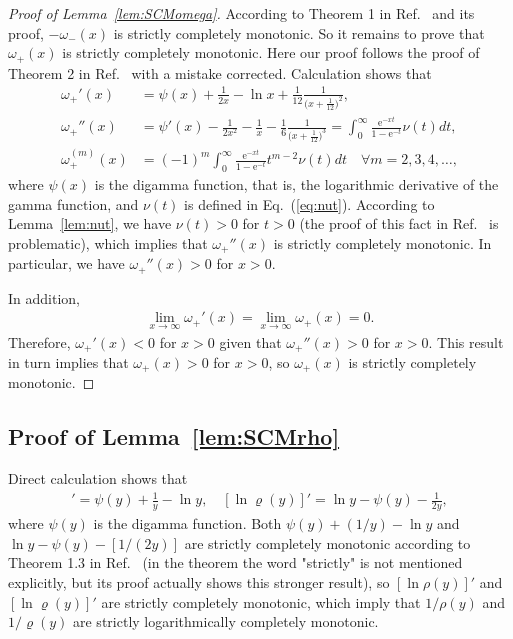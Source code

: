 \documentclass[aop]{imsart}
\theoremstyle{plain}
\theoremstyle{remark}
\newcommand{\rme}{\mathrm{e}}
\newcommand{\1}{\operatorname{\uppercase\expandafter{\romannumeral1}}}
\newcommand{\2}{\operatorname{\uppercase\expandafter{\romannumeral2}}}
\newcommand{\3}{\operatorname{\uppercase\expandafter{\romannumeral3}}}
\newcommand{\4}{\operatorname{\uppercase\expandafter{\romannumeral4}}}
\newcommand{\5}{\operatorname{\uppercase\expandafter{\romannumeral5}}}
\newcommand{\6}{\operatorname{\uppercase\expandafter{\romannumeral6}}}
\newcommand{\7}{\operatorname{\uppercase\expandafter{\romannumeral7}}}
\newcommand{\8}{\operatorname{\uppercase\expandafter{\romannumeral8}}}
\newcommand{\9}{\operatorname{\uppercase\expandafter{\romannumeral9}}}
\newcommand{\eref}[1]{Eq.~\textup{(\ref{#1})}}
\newcommand{\lref}[1]{Lemma~\ref{#1}}
\newcommand{\rcite}[1]{Ref.~\cite{#1}}
\begin{document}
\begin{appendix}
\begin{proof}[Proof of \lref{lem:SCMomega}]
	According to Theorem 1  in \rcite{Mort10} and its proof,   $-\omega_-(x)$ is strictly completely monotonic. So it remains to prove that $\omega_+(x)$ is strictly completely monotonic. Here our proof follows the proof of Theorem 2 in  \rcite{Mort10} with a mistake corrected. Calculation shows that
	\begin{align}
	\omega_+'(x)&=\psi(x)+\frac{1}{2x}-\ln x+\frac{1}{12}\frac{1}{\bigl(x+\frac{1}{12}\bigr)^2},\\
	\omega_+''(x)&=\psi'(x)-\frac{1}{2x^2}-\frac{1}{x}-\frac{1}{6}\frac{1}{\bigl(x+\frac{1}{12}\bigr)^3}=
	\int_{0}^\infty\frac{\rme^{-xt}}{1-\rme^{-t}}\nu(t)dt,\\
	\omega_+^{(m)}(x)&=(-1)^m\int_{0}^\infty\frac{\rme^{-xt}}{1-\rme^{-t}}t^{m-2}\nu(t)dt \quad \forall m=2, 3, 4,\ldots,
	\end{align}
	where $\psi(x)$ is the digamma function, that is, the logarithmic derivative of the gamma function, and $\nu(t)$ is defined in \eref{eq:nut}. 
	According to \lref{lem:nut}, we have $\nu(t)>0$ for $t>0$ (the proof of this fact in  \rcite{Mort10} is problematic), which implies that $\omega_+''(x)$ is strictly completely monotonic. In particular, we have $\omega_+''(x)>0$ for $x>0$. 
	
	In addition,
	\begin{align}
	\lim_{x\to\infty} \omega_+'(x)=\lim_{x\to\infty} \omega_+(x)=0. 
	\end{align}
	Therefore, $\omega_+'(x)<0$ for $x>0$ given that $\omega_+''(x)>0$ for $x>0$. This result in turn implies that $\omega_+(x)>0$ for $x>0$, so  $\omega_+(x)$ is strictly completely monotonic. 
\end{proof}


\subsection{Proof of \lref{lem:SCMrho}}
	Direct calculation shows that
	\begin{align}
	[\ln \rho(y)]'=\psi(y)+\frac{1}{y}-\ln y,\quad
	[\ln \varrho(y)]'=\ln y-\psi(y)-\frac{1}{2y},
	\end{align}
	where $\psi(y)$ is the digamma function. 
	Both $\psi(y)+(1/y)-\ln y$ and $\ln y-\psi(y)-[1/(2y)]$ are strictly completely monotonic  according to Theorem 1.3 in \rcite{Qi07} (in the theorem the word "strictly" is not mentioned explicitly, but its proof  actually shows this stronger result), so  $[\ln \rho(y)]'$ and $[\ln \varrho(y)]'$ are strictly completely monotonic, which imply that $1/\rho(y)$ and $1/\varrho(y)$  are strictly logarithmically completely monotonic. 


\end{appendix}
\end{document}
